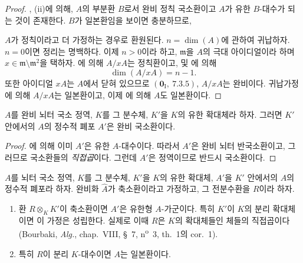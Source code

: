 \begin{proof}
, (ii)에 의해, $A$의 부분환 $B$로서 완비 정칙
국소환이고 $A$가 유한 $B$-대수가 되는 것이 존재한다. $B$가
일본환임을 보이면 충분하므로,


$A$가 정칙이라고 더 가정하는 경우로 환원된다. $n=\dim(A)$에 관하여
귀납하자. $n=0$이면 정리는 명백하다. 이제 $n>0$이라 하고,
$\mathfrak m$을 $A$의 극대 아이디얼이라 하며
$x\in\mathfrak m\setminus\mathfrak m^2$을 택하자.
에 의해 $A/xA$는 정칙환이고,
 및 에 의해
\[
  \dim(A/xA)=n-1.
\]
또한 아이디얼 $xA$는 $A$에서 닫혀 있으므로
$(\mathbf 0_{\mathrm I},~7.3.5)$, $A/xA$는 완비이다. 귀납가정에 의해
$A/xA$는 일본환이고, 이제 에 의해 $A$도
일본환이다.
\end{proof}

\begin{corollary}[23.1.6]
\label{0.23.1.6-ko}
$A$를 완비 뇌터 국소 정역, $K$를 그 분수체, $K'$을 $K$의 유한
확대체라 하자. 그러면 $K'$ 안에서의 $A$의 정수적 폐포 $A'$은 완비
국소환이다.
\end{corollary}

\begin{proof}
에 의해 이미 $A'$은 유한 $A$-대수이다. 따라서
$A'$은 완비 뇌터 반국소환이고, 그러므로 국소환들의 \emph{직접곱}이다.
그런데 $A'$은 정역이므로 반드시 국소환이다.
\end{proof}

\begin{proposition}[23.1.7]
\label{0.23.1.7-ko}
$A$를 뇌터 국소 정역, $K$를 그 분수체, $K'$을 $K$의 유한 확대체,
$A'$을 $K'$ 안에서의 $A$의 정수적 폐포라 하자. 완비화
$\widehat A$가 축소환이라고 가정하고, 그 전분수환을 $R$이라 하자.
\begin{enumerate}
  \item[(i)] 환 $R\otimes_KK'$이 축소환이면 $A'$은 유한형
  $A$-가군이다. 특히 $K'$이 $K$의 분리 확대체이면 이 가정은
  성립한다. 실제로 이때 $R$은 $K$의 확대체들인 체들의 직접곱이다
  (Bourbaki, \emph{Alg.}, chap.~VIII, §~7,
  n\textsuperscript{o}~3, th.~1의 cor.~1).
  \item[(ii)] 특히 $R$이 분리 $K$-대수이면 $A$는 일본환이다.
\end{enumerate}
\end{proposition}

